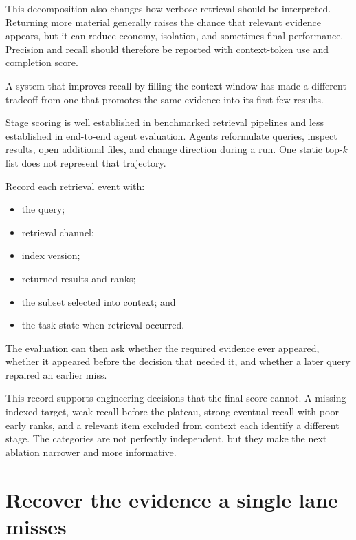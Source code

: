 This decomposition also changes how verbose retrieval should be interpreted. Returning more material generally raises the chance that relevant evidence appears, but it can reduce economy, isolation, and sometimes final performance. Precision and recall should therefore be reported with context-token use and completion score.

A system that improves recall by filling the context window has made a different tradeoff from one that promotes the same evidence into its first few results.

Stage scoring is well established in benchmarked retrieval pipelines and less established in end-to-end agent evaluation. Agents reformulate queries, inspect results, open additional files, and change direction during a run. One static top-\(k\) list does not represent that trajectory.


Record each retrieval event with:

\begin{itemize}
\tightlist
\item
  the query;
\item
  retrieval channel;
\item
  index version;
\item
  returned results and ranks;
\item
  the subset selected into context; and
\item
  the task state when retrieval occurred.
\end{itemize}

The evaluation can then ask whether the required evidence ever appeared, whether it appeared before the decision that needed it, and whether a later query repaired an earlier miss.

This record supports engineering decisions that the final score cannot. A missing indexed target, weak recall before the plateau, strong eventual recall with poor early ranks, and a relevant item excluded from context each identify a different stage. The categories are not perfectly independent, but they make the next ablation narrower and more informative.

\hypertarget{recover-the-evidence-a-single-lane-misses}{%
\section{Recover the evidence a single lane misses}\label{recover-the-evidence-a-single-lane-misses}}

